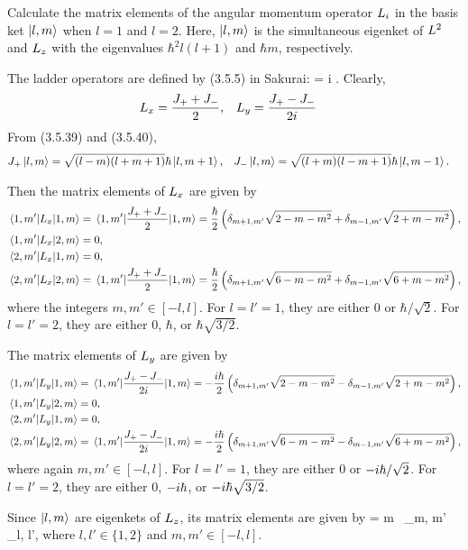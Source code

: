 \begin{problem}
	Calculate the matrix elements of the angular momentum operator $L_i$ in the basis ket $\ket{l, m}$ when $l = 1$ and $l = 2$.  Here, $\ket{l, m}$ is the simultaneous eigenket of $L^2$ and $L_z$ with the eigenvalues $\hbar^2 l (l + 1)$ and $\hbar m$, respectively.
\end{problem}

\begin{solution}
	The ladder operators are defined by (3.5.5) in Sakurai:
	\beq
		\Jpm = \Lx \pm i \Ly.
	\eeq
	Clearly,
	\begin{align*}
		L_x &= \frac{J_+ + J_-}{2}, &
		L_y &= \frac{J_+ - J_-}{2 i}
	\end{align*}
	From (3.5.39) and (3.5.40),
	\begin{align*}
		J_+ \ket{l, m} &= \sqrt{(l - m)(l + m + 1)} \hbar \ket{l, m+1}, &
		J_- \ket{l, m} &= \sqrt{(l + m)(l - m + 1)} \hbar \ket{l, m-1}.
	\end{align*}
	
	Then the matrix elements of $L_x$ are given by
	\begin{align*}
		\mel*{1, m'}{L_x}{1, m} &= \mel*{1, m'}{\frac{J_+ + J_-}{2}}{1, m} = \frac{\hbar}{2} \left( \delta_{m+1, m'} \sqrt{2 - m - m^2} + \delta_{m-1, m'} \sqrt{2 + m - m^2} \right), \\
		\mel*{1, m'}{L_x}{2, m} &= 0, \\
		\mel*{2, m'}{L_x}{1, m} &= 0, \\
		\mel*{2, m'}{L_x}{2, m} &= \mel*{1, m'}{\frac{J_+ + J_-}{2}}{1, m} = \frac{\hbar}{2} \left( \delta_{m+1, m'} \sqrt{6 - m - m^2} + \delta_{m-1, m'} \sqrt{6 + m - m^2} \right),
	\end{align*}
	where the integers $m, m' \in [-l, l]$.  For $l = l' = 1$, they are either $0$ or $\hbar/\sqrt{2}$.  For $l = l' = 2$, they are either $0$, $\hbar$, or $\hbar \sqrt{3/2}$.
	
	The matrix elements of $L_y$ are given by
	\begin{align*}
		\mel*{1, m'}{L_y}{1, m} &= \mel*{1, m'}{\frac{J_+ - J_-}{2 i}}{1, m} = -\frac{i\hbar}{2} \left( \delta_{m+1, m'} \sqrt{2 - m - m^2} - \delta_{m-1, m'} \sqrt{2 + m - m^2} \right), \\
		\mel*{1, m'}{L_y}{2, m} &= 0, \\
		\mel*{2, m'}{L_y}{1, m} &= 0, \\
		\mel*{2, m'}{L_y}{2, m} &= \mel*{1, m'}{\frac{J_+ - J_-}{2 i}}{1, m} = -\frac{i\hbar}{2} \left( \delta_{m+1, m'} \sqrt{6 -m - m^2} - \delta_{m-1, m'} \sqrt{6 + m - m^2} \right),
	\end{align*}
	where again $m, m' \in [-l, l]$.  For $l = l' = 1$, they are either $0$ or $-i\hbar/\sqrt{2}$.  For $l = l' = 2$, they are either $0$, $-i\hbar$, or $-i\hbar \sqrt{3/2}$.
		
	Since $\ket{l, m}$ are eigenkets of $L_z$, its matrix elements are given by
	\beq
		 = \hbar m \, \delta_{m, m'} \, \delta_{l, l'},
	\eeq
	where $l, l' \in \{1, 2\}$ and $m, m' \in [-l, l]$.
\end{solution}